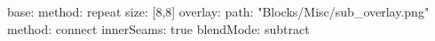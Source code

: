 base:
  method: repeat
  size: [8,8]
overlay:
  path: "Blocks/Misc/sub_overlay.png"
  method: connect
  innerSeams: true
  blendMode: subtract